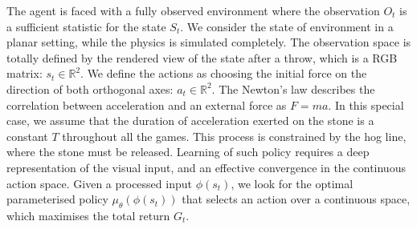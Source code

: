 \documentclass[oneside,11pt,a4paper]{article}
\begin{document}
The agent is faced with a fully observed environment where the observation $O_t$ is a sufficient statistic for the state $S_t$. We consider the state of environment in a planar setting, while the physics is simulated completely. The observation space is totally defined by the rendered view of the state after a throw, which is a RGB matrix: $s_t \in \mathbb R^2$. We define the actions as choosing the initial force on the direction of both orthogonal axes: $a_t\in \mathbb R^2$. The Newton's law describes the correlation between acceleration and an external force as $F=ma$. In this special case, we assume that the duration of acceleration exerted on the stone is a constant $T$ throughout all the games. This process is constrained by the hog line, where the stone must be released.
\newline
\newline
\noindent
Learning of such policy requires a deep representation of the visual input, and an effective convergence in the continuous action space. Given a processed input $\phi(s_t)$, we look for the optimal parameterised policy $\mu_\theta(\phi(s_t))$ that selects an action over a continuous space, which maximises the total return $G_t$.
\newline
\newline
\noindent
\end{document}
